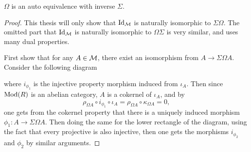 \begin{theorem}
    \( \Omega \) is an auto equivalence with inverse \( \Sigma \).
\end{theorem}
\begin{proof}
    This thesis will only show that \( \operatorname{Id}_{{\mathcal{M}}} \) is naturally isomorphic to \( \Sigma\Omega \). The omitted part that \( \operatorname{Id}_{{\mathcal{M}}} \) is naturally isomorphic to \( \Omega\Sigma \) is very similar, and uses many dual properties.

    First show that for any \( A \in {\mathcal{M}} \), there exist an isomorphism from \( A \to \Sigma\Omega A \). Consider the following diagram
    \begin{center}
    \end{center}
    where \( i_{\phi_1} \) is the injective property morphism induced from \( \iota_A \). Then since \( \operatorname{Mod}(R) \) is an abelian category, \( A \) is a cokernel of \( \iota_A \), and by
    \[
        \rho_{\Omega A} \circ i_{\phi_1} \circ \iota_A = \rho_{\Omega A} \circ \kappa_{\Omega A} = 0,
    \]
    one gets from the cokernel property that there is a uniquely induced morphism \( \phi_1: A \to \Sigma\Omega A \). Then doing the same for the lower rectangle of the diagram, using the fact that every projective is also injective, then one gets the morphisms \( i_{\phi_2} \) and \( \phi_2 \) by similar arguments.


\end{proof}
